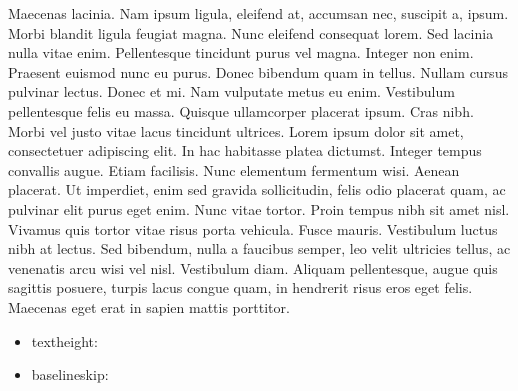 \documentclass[draft,12pt,twoside,a4paper]{book}
\begin{document}
Maecenas lacinia.
Nam ipsum ligula, eleifend at, accumsan nec, suscipit a, ipsum.
Morbi blandit ligula feugiat magna.
Nunc eleifend consequat lorem.
Sed lacinia nulla vitae enim.
Pellentesque tincidunt purus vel magna.
Integer non enim.
Praesent euismod nunc eu purus.
Donec bibendum quam in tellus.
Nullam cursus pulvinar lectus.
Donec et mi.
Nam vulputate metus eu enim.
Vestibulum pellentesque felis eu massa.
Quisque ullamcorper placerat ipsum.
Cras nibh.
Morbi vel justo vitae lacus tincidunt ultrices.
Lorem ipsum dolor sit amet, consectetuer adipiscing elit.
In hac habitasse platea dictumst.
Integer tempus convallis augue.
Etiam facilisis.
Nunc elementum fermentum wisi.
Aenean placerat.
Ut imperdiet, enim sed gravida sollicitudin, felis odio placerat quam,
 ac pulvinar elit purus eget enim.
Nunc vitae tortor.
Proin tempus nibh sit amet nisl.
Vivamus quis tortor vitae risus porta vehicula.
Fusce mauris.
Vestibulum luctus nibh at lectus.
Sed bibendum, nulla a faucibus semper, leo velit ultricies tellus,
 ac venenatis arcu wisi vel nisl.
Vestibulum diam.
Aliquam pellentesque, augue quis sagittis posuere, turpis lacus congue quam,
 in hendrerit risus eros eget felis.
Maecenas eget erat in sapien mattis porttitor.

\begin{itemize}
\item textheight: \the\textheight
\item baselineskip: \the\baselineskip
\end{itemize}
\end{document}
